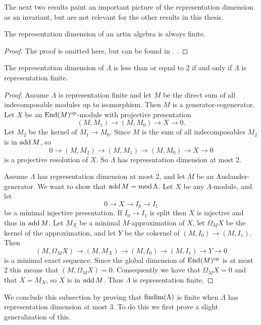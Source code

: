 The next two results paint an important picture of the representation dimension as an invariant, but are not relevant for the other results in this thesis.

\begin{theorem}
	The representation dimension of an artin algebra is always finite.
	\begin{proof}
		The proof is omitted here, but can be found in \cite{Iya02}. .
	\end{proof}
\end{theorem}

\begin{prop}
	The representation dimension of $\Lambda$ is less than or equal to 2 if and only if $\Lambda$ is representation finite.
	\begin{proof}
		Assume $\Lambda$ is representation finite and let $M$ be the direct sum of all indecomposable modules up to isomorphism. Then $M$ is a generator-cogenerator. Let $X$ be an $\operatorname{End}(M)^{\operatorname{op}}$-module with projective presentation 
		$$(M,M_1) \to (M, M_0) \to X \to 0.$$ 
		Let $M_2$ be the kernel of $M_1 \to M_0$. Since $M$ is the sum of all indecomposables $M_2$ is in $\operatorname{add} M$, so 
		$$0 \to (M, M_2) \to (M,M_1) \to (M, M_0) \to X \to 0$$ 
		is a projective resolution of $X$. So $\Lambda$ has representation dimension at most 2.
		
		Assume $\Lambda$ has representation dimension at most 2, and let $M$ be an Auslander-generator. We want to show that $\operatorname{add} M = \operatorname{mod}\Lambda$. Let $X$ be any $\Lambda$-module, and let $$0 \to X \to I_0 \to I_1$$ be a minimal injective presentation. If $I_0 \to I_1$ is split then $X$ is injective and thus in $\operatorname{add} M$. Let $M_X$ be a minimal $M$-approximation of $X$, let $\Omega_M X$ be the kernel of the approximation, and let $Y$ be the cokernel of $(M, I_0) \to (M, I_1)$. Then $$(M,\Omega_M X) \to (M,M_X) \to (M, I_0) \to (M, I_1) \to Y \to 0$$ is a minimal exact sequence. Since the global dimension of $\operatorname{End}(M)^{\operatorname{op}}$ is at most 2 this means that $(M, \Omega_M X)=0$. Consequently we have that $\Omega_M X = 0$ and that $X=M_X$, so $X$ is in $\operatorname{add} M$. Thus $\Lambda$ is representation finite.
	\end{proof}
\end{prop}

We conclude this subsection by proving that $\operatorname{findim}(\Lambda)$ is finite when $\Lambda$ has representation dimension at most 3. To do this we first prove a slight generalization of this.

